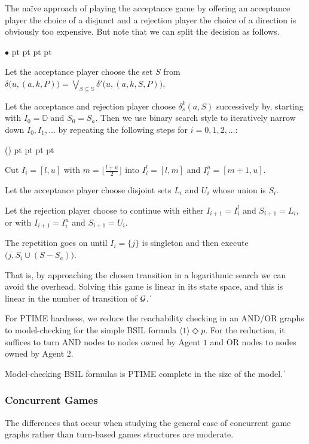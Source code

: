 \documentclass[11pt]{article}
\newcommand{\calg}{{\cal G}}
\newcommand{\pevt}{\Diamond}
\newcommand{\bbbbd}{{\mathbb D}}
\newcommand{\bbbbs}{{\mathbb S}}
\def\qed{\ifmmode\|\else{\unskip\nobreak\hfil
\penalty50\hskip1em\null\nobreak\hfil$\blacksquare$
\parfillskip=0pt\finalhyphendemerits=0\endgraf}\fi}
\newenvironment{list1}{\begin{list}{$\bullet$}
{\topsep 0 pt \parsep 0 pt \partopsep 0 pt \itemsep 0 pt}}{\end{list}}
\newcounter{sequent1}
\newcounter{sequent2}
\newcounter{sequent3}
\newcounter{sequent4}
\newenvironment{stmt1}{\begin{list}{(\arabic{sequent1})}
  {\usecounter{sequent1}
    \topsep 0 pt \parsep 2 pt \partopsep 0 pt \itemsep 0 pt
} }{\end{list}}
\begin{document}
The na\"ive approach of playing the acceptance game by 
offering an acceptance player the choice of a disjunct 
and a rejection player the choice of a direction is obviously too expensive. 
But note that we can split the decision as follows. 
\begin{list1}
\item Let the acceptance player choose the set $S$ 
  from $\delta\big(u,(a,k,P)\big) = 
  \bigvee_{S \subseteq \bbbbs}\delta'\big(u,(a,k,S,P)\big)$,
\item Let the acceptance and rejection player choose 
  $\delta_s^k(a,S)$ successively by, starting with 
  $I_0=\bbbbd$ and $S_0 = S_a$.  
  Then we use binary search style to iteratively 
  narrow down $I_0,I_1,\ldots$ by repeating the following steps for  
  $i=0,1,2,\ldots$:  
  \begin{stmt1}
  \item Cut $I_i = [l,u]$ with $m=\big\lfloor\frac{l+u}{2}\big\rfloor$ 
    into $I_i^l = [l,m]$ and $I_i^u = [m+1,u]$.   
  \item Let the acceptance player choose disjoint sets $L_i$ and $U_i$ 
    whose union is $S_i$.    
  \item Let the rejection player choose to continue 
    with either $I_{i+1}= I_i^l$ and $S_{i+1} = L_i$, 
    or with $I_{i+1}= I_i^u$ and $S_{i+1} = U_i$.  
  \end{stmt1}
  The repetition goes on until 
  $I_i =\{j\}$ is singleton and then execute 
  $\big(j,S_i \cup (S - S_a)\big)$.
\end{list1}
That is, by approaching the chosen transition in a logarithmic search we can avoid the overhead. Solving this game is linear in its state space, and this is linear in the number of transition of $\calg$.
\qed 



For PTIME hardness, we reduce the reachability checking 
in an AND/OR graphs \cite{Immerman81} to model-checking for the simple BSIL formula $\langle 1 \rangle \pevt p$.
For the reduction, it suffices to turn AND nodes to nodes owned by Agent $1$ and OR nodes to nodes owned by Agent $2$.

{\theorem\label{thm.aa.lb} 
Model-checking BSIL formulas is PTIME complete in the size of the model.
}
\qed 

\subsubsection{Concurrent Games}
The differences that occur when studying the general case of concurrent game graphs rather than turn-based games structures are moderate.
\end{document}
